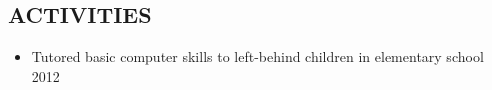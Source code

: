 \documentclass[margin,10pt]{res} %
\begin{document}
\begin{resume}
\section{ACTIVITIES}
\begin{itemize}\itemsep -12pt
\item Tutored basic computer skills to left-behind children in elementary school {\hfill  2012}\\
\end{itemize}

\end{resume}
\end{document}
